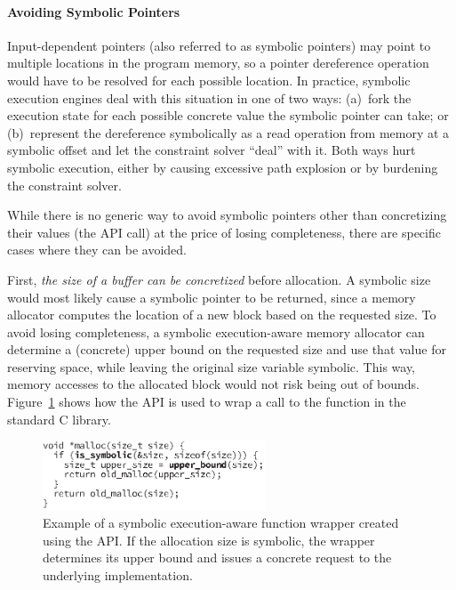 \paragraph{Avoiding Symbolic Pointers}

Input-dependent pointers (also referred to as symbolic pointers) may point to multiple locations in the program memory, so a pointer dereference operation would have to be resolved for each possible location.  In practice, symbolic execution engines deal with this situation in one of two ways:
%
(a)~fork the execution state for each possible concrete value the symbolic pointer can take; or
%
(b)~represent the dereference symbolically as a read operation from memory at a symbolic offset and let the constraint solver ``deal'' with it.
%
Both ways hurt symbolic execution, either by causing excessive path explosion or by burdening the constraint solver.

While there is no generic way to avoid symbolic pointers other than concretizing their values (the  API call) at the price of losing completeness, there are specific cases where they can be avoided.

First, \emph{the size of a buffer can be concretized} before allocation.  A symbolic size would most likely cause a symbolic pointer to be returned, since a memory allocator computes the location of a new block based on the requested size.  To avoid losing completeness, a symbolic execution-aware memory allocator can determine a (concrete) upper bound on the requested size and use that value for reserving space, while leaving the original size variable symbolic.  This way, memory accesses to the allocated block would not risk being out of bounds.  Figure~\ref{fig:sym-malloc} shows how the \chef API is used to wrap a call to the  function in the standard C library.

\begin{figure}
  \centering
  \includegraphics[width=2.6in]{figures/chef/mallocopt}
  \caption{Example of a symbolic execution-aware  function wrapper created using the \chef API.  If the allocation size is symbolic, the wrapper determines its upper bound and issues a concrete request to the underlying implementation.}
  \label{fig:sym-malloc}
\end{figure}

